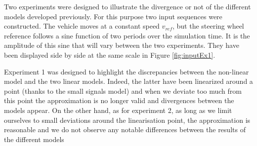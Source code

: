 Two experiments were designed to illustrate the divergence or not of the different models developed previously. For this purpose two input sequences were constructed. The vehicle moves at a constant speed $v_{ref}$, but the steering wheel reference follows a sine function of two periods over the simulation time. It is the amplitude of this sine that will vary between the two experiments. They have been displayed side by side at the same scale in Figure \ref{fig:inputEx1}.

Experiment 1 was designed to highlight the discrepancies between the non-linear model and the two linear models. Indeed, the latter have been linearized around a point (thanks to the small signals model) and when we deviate too much from this point the approximation is no longer valid and divergences between the models appear. 
On the other hand, as for experiment 2, as long as we limit ourselves to small deviations around the linearisation point, the approximation is reasonable and we do not observe any notable differences between the results of the different models


